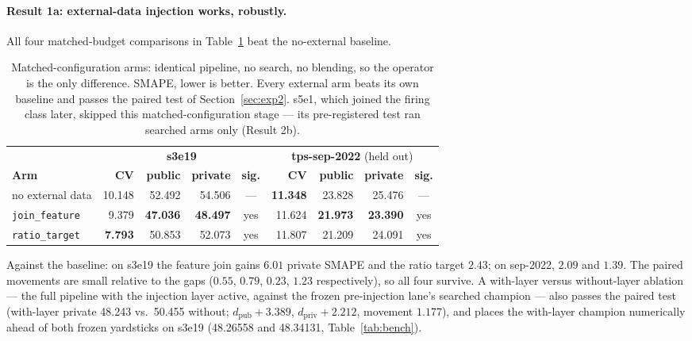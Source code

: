 \documentclass[11pt,a4paper]{article}
\begin{document}
\paragraph{Result 1a: external-data injection works, robustly.} All four matched-budget comparisons in Table~\ref{tab:v5-2x2} beat the no-external baseline.

\begin{table}[H]
\centering\small
\caption{Matched-configuration arms: identical pipeline, no search, no blending, so the operator is the only difference. SMAPE, lower is better. Every external arm beats its own baseline and passes the paired test of Section~\ref{sec:exp2}. s5e1, which joined the firing class later, skipped this matched-configuration stage --- its pre-registered test ran searched arms only (Result 2b).}
\label{tab:v5-2x2}
\setlength{\tabcolsep}{5pt}
\begin{tabular}{@{}lrrrcrrrc@{}}
\toprule
 & \multicolumn{4}{c}{\textbf{s3e19}} & \multicolumn{4}{c}{\textbf{tps-sep-2022} (held out)} \\
\cmidrule(lr){2-5}\cmidrule(lr){6-9}
\textbf{Arm} & \textbf{CV} & \textbf{public} & \textbf{private} & \textbf{sig.} & \textbf{CV} & \textbf{public} & \textbf{private} & \textbf{sig.} \\
\midrule
no external data & 10.148 & 52.492 & 54.506 & --- & \textbf{11.348} & 23.828 & 25.476 & --- \\
\texttt{join\_feature} & 9.379 & \textbf{47.036} & \textbf{48.497} & yes & 11.624 & \textbf{21.973} & \textbf{23.390} & yes \\
\texttt{ratio\_target} & \textbf{7.793} & 50.853 & 52.073 & yes & 11.807 & 21.209 & 24.091 & yes \\
\bottomrule
\end{tabular}
\end{table}

Against the baseline: on s3e19 the feature join gains $6.01$ private SMAPE and the ratio target $2.43$; on sep-2022, $2.09$ and $1.39$. The paired movements are small relative to the gaps ($0.55$, $0.79$, $0.23$, $1.23$ respectively), so all four survive. A with-layer versus without-layer ablation --- the full pipeline with the injection layer active, against the frozen pre-injection lane's searched champion --- also passes the paired test (with-layer private 48.243 vs.\ 50.455 without; $d_{\mathrm{pub}}{+}3.389$, $d_{\mathrm{priv}}{+}2.212$, movement $1.177$), and places the with-layer champion numerically ahead of both frozen yardsticks on s3e19 (48.26558 and 48.34131, Table~\ref{tab:bench}).
\end{document}
